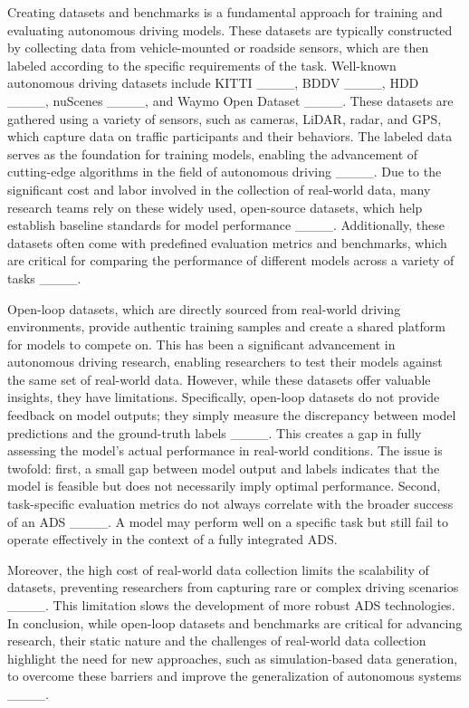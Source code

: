 Creating datasets and benchmarks is a fundamental approach for training and evaluating autonomous driving models. These datasets are typically constructed by collecting data from vehicle-mounted or roadside sensors, which are then labeled according to the specific requirements of the task. Well-known autonomous driving datasets include KITTI ____, BDDV ____, HDD ____, nuScenes ____, and Waymo Open Dataset ____. These datasets are gathered using a variety of sensors, such as cameras, LiDAR, radar, and GPS, which capture data on traffic participants and their behaviors. The labeled data serves as the foundation for training models, enabling the advancement of cutting-edge algorithms in the field of autonomous driving ____. Due to the significant cost and labor involved in the collection of real-world data, many research teams rely on these widely used, open-source datasets, which help establish baseline standards for model performance ____. Additionally, these datasets often come with predefined evaluation metrics and benchmarks, which are critical for comparing the performance of different models across a variety of tasks ____.

Open-loop datasets, which are directly sourced from real-world driving environments, provide authentic training samples and create a shared platform for models to compete on. This has been a significant advancement in autonomous driving research, enabling researchers to test their models against the same set of real-world data. However, while these datasets offer valuable insights, they have limitations. Specifically, open-loop datasets do not provide feedback on model outputs; they simply measure the discrepancy between model predictions and the ground-truth labels ____. This creates a gap in fully assessing the model’s actual performance in real-world conditions. The issue is twofold: first, a small gap between model output and labels indicates that the model is feasible but does not necessarily imply optimal performance. Second, task-specific evaluation metrics do not always correlate with the broader success of an ADS ____. A model may perform well on a specific task but still fail to operate effectively in the context of a fully integrated ADS.

Moreover, the high cost of real-world data collection limits the scalability of datasets, preventing researchers from capturing rare or complex driving scenarios ____. This limitation slows the development of more robust ADS technologies. In conclusion, while open-loop datasets and benchmarks are critical for advancing research, their static nature and the challenges of real-world data collection highlight the need for new approaches, such as simulation-based data generation, to overcome these barriers and improve the generalization of autonomous systems ____.

